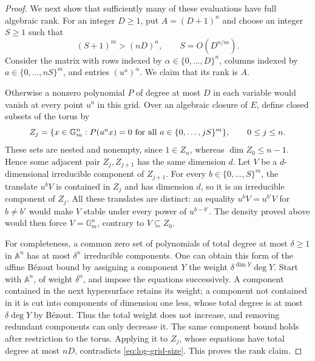 \begin{proof}
We next show that sufficiently many of these evaluations have full
algebraic rank.  For an integer $D\geq1$, put $A=(D+1)^n$ and choose
an integer $S\geq1$ such that
\begin{equation}\label{eq:log-grid-size}
 (S+1)^m>(nD)^n,
 \qquad S=O(D^{n/m}).
\end{equation}
Consider the matrix with rows indexed by
$\alpha\in\{0,\ldots,D\}^n$, columns indexed by
$a\in\{0,\ldots,nS\}^m$, and entries $(u^a)^\alpha$.
We claim that its rank is $A$.

Otherwise a nonzero polynomial $P$ of degree at most $D$ in each
variable would vanish at every point $u^a$ in this grid.  Over an
algebraic closure of $E$, define closed subsets of the torus by
\[
 Z_j=\{x\in\mathbb G_m^n:
          P(u^a x)=0\ \hbox{for all }a\in\{0,\ldots,jS\}^m\},
 \qquad 0\leq j\leq n.
\]
These sets are nested and nonempty, since $1\in Z_n$, whereas
$\dim Z_0\leq n-1$.  Hence some adjacent pair $Z_j,Z_{j+1}$ has
the same dimension $d$.  Let $V$ be a $d$-dimensional irreducible
component of $Z_{j+1}$.  For every
$b\in\{0,\ldots,S\}^m$, the translate $u^bV$ is contained in
$Z_j$ and has dimension $d$, so it is an irreducible component of
$Z_j$.  All these translates are distinct: an equality
$u^bV=u^{b'}V$ for $b\ne b'$ would make $V$ stable under every
power of $u^{b-b'}$.  The density proved above would then force
$V=\mathbb G_m^n$, contrary to $V\subseteq Z_0$.

For completeness, a common zero set of polynomials of total degree
at most $\delta\geq1$ in $\mathbb A^n$ has at most $\delta^n$
irreducible components.  One can obtain this form of the affine
B\'ezout bound by assigning a component $Y$ the weight
$\delta^{\dim Y}\deg Y$.  Start with $\mathbb A^n$, of weight
$\delta^n$, and impose the equations successively.  A component
contained in the next hypersurface retains its weight; a component
not contained in it is cut into components of dimension one less,
whose total degree is at most $\delta\deg Y$ by B\'ezout.  Thus
the total weight does not increase, and removing redundant components
can only decrease it.  The same component bound holds after
restriction to the torus.  Applying it to $Z_j$, whose equations
have total degree at most $nD$, contradicts
\eqref{eq:log-grid-size}.  This proves the rank claim.


\end{proof}
